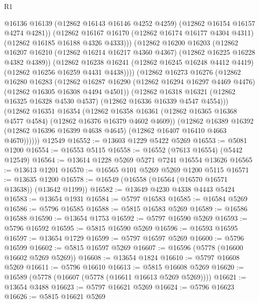 \begin{lexlean}{R1}
\begin{coremodule}
              @16136
              @16139
              (@12862 @16143 @16146 @4252 @4259)
              (@12862 @16154 @16157 @4274 @4281))
            (@12862
              @16167
              @16170
              (@12862 @16174 @16177 @4304 @4311)
              (@12862 @16185 @16188 @4326 @4333)))
          (@12862
            @16200
            @16203
            (@12862
              @16207
              @16210
              (@12862 @16214 @16217 @4360 @4367)
              (@12862 @16225 @16228 @4382 @4389))
            (@12862
              @16238
              @16241
              (@12862 @16245 @16248 @4412 @4419)
              (@12862 @16256 @16259 @4431 @4438))))
        (@12862
          @16273
          @16276
          (@12862
            @16280
            @16283
            (@12862
              @16287
              @16290
              (@12862 @16294 @16297 @4469 @4476)
              (@12862 @16305 @16308 @4494 @4501))
            (@12862
              @16318
              @16321
              (@12862 @16325 @16328 @4530 @4537)
              (@12862 @16336 @16339 @4547 @4554)))
          (@12862
            @16351
            @16354
            (@12862
              @16358
              @16361
              (@12862 @16365 @16368 @4577 @4584)
              (@12862 @16376 @16379 @4602 @4609))
            (@12862
              @16389
              @16392
              (@12862 @16396 @16399 @4638 @4645)
              (@12862 @16407 @16410 @4663 @4670))))))
    @12549
@16552 := @13603 @1229 @5422 @5269
@16553 := @5081 @1200
@16554 := @16553 @5115
@16558 := @16552 (@7613 @16554) (@5442 @12549)
@16564 := @13614 @1228 @5269 @5271 @7241 @16554 @13626
@16565 := @13613 @1201
@16570 := @16565 @101 @5269 @5269 @1200 @5115
@16571 := @13635 @1200
@16578 := @16549 (@16558 (@16564 (@16570 @16571 @13638)) (@13642 @1199))
@16582 := @13649 @4230 @4338 @4443 @5424
@16583 := @13654 @1931
@16584 := @5797 @16583
@16585 := @16584 @5269
@16586 := @5796 @16585
@16588 := @5815 @16583 @5269
@16589 := @16586 @16588
@16590 := @13654 @1753
@16592 := @5797 @16590 @5269
@16593 := @5796 @16592
@16595 := @5815 @16590 @5269
@16596 := @16593 @16595
@16597 := @13654 @1729
@16599 := @5797 @16597 @5269
@16600 := @5796 @16599
@16602 := @5815 @16597 @5269
@16607 := @16596 (@5778 (@16600 @16602 @5269 @5269))
@16608 := @13654 @1824
@16610 := @5797 @16608 @5269
@16611 := @5796 @16610
@16613 := @5815 @16608 @5269
@16620 := @16589 (@5778 (@16607 (@5778 (@16611 @16613 @5269 @5269))))
@16621 := @13654 @3488
@16623 := @5797 @16621 @5269
@16624 := @5796 @16623
@16626 := @5815 @16621 @5269

\end{coremodule}
\end{lexlean}
